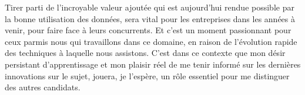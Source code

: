 \documentclass[11pt, a4paper]{awesome-cv}
\begin{document}
\begin{cvletter}
\begin{comment}
Since leaving the world of academic research I have been able to adapt my skills to the fields of Data Engineering and Data Analysis. 
I have also extensive experience with Python, which I have used in several contexts, for example as a tool for analyzing data with 
\texttt{pandas}/\texttt{scikit-learn}, as a tool for moving/extracting data with \texttt{sqlalchemy} and as a means to visualize data with 
\texttt{matplotlib/seaborn/Plotly}, among others. Through practice, I have gained significant knowledge of SQL and tools like Dataiku DSS, 
for which I am an instructor.
Among my most notable professional experiences I count the time that I spend at Essilor. My job consisted of \underline{creating ETLs} written in python which 
handled data from the company's fabrication machines and optical calculators. These data were then made available through the Amazon cloud and analyzed 
using Dataiku DSS. My current project at L'Oréal has brought me \underline{to work on the construction of a data infrastructure} to handle the needs of the R\&D teams, 
thus it has been paramount to construct datawarehouses and datamarts to give users access to up to data information on things like worldwide products, ingredients, 
regulations, etc.  My added value in these projects appart from my daily activities has been twofold: by applying my data analysis skills I have been able to 
provide decision makers with valuable information with regard to the tasks that need to be prioritized while my capacity to abstract concepts has allowed me to 
automate time-consuming tasks.

I am a highly motivated person who is able to adapt to different environments, whether they be technical or cultural, having lived in Colombia, Ireland and France. The projects that I have worked on outside fundamental research have touched upon a theme that is common for many companies nowdays, namely the migration of their existing on-premise infrastructures towards the cloud. 
Leveraging the incredible value that is present within data will be vital for businesses in the coming years as it will allow them gain a competitive edge over their competitors. These are indeed exciting times for those of us who are working in this field due to the fast-paced evolution that we are witnessing. It is within this context that my eagerness to learn and stay up to date with the latest developments plays a critical role in distinguishing myself from other candidates. 
\end{comment}

Tirer parti de l'incroyable valeur ajoutée qui est aujourd'hui rendue possible par la bonne utilisation des données, sera vital pour les entreprises dans les années à venir, pour faire face à leurs concurrents. 
Et c'est un moment passionnant pour ceux parmis nous qui travaillons dans ce domaine, en raison de l'évolution rapide des techniques à laquelle nous assistons. 
C'est dans ce contexte que mon désir persistant d'apprentissage et mon plaisir réel de me tenir informé sur les dernières innovations sur le sujet, jouera, je l'espère, un rôle essentiel pour me distinguer des autres candidats.
\
\end{cvletter}

\makeletterclosing
\end{document}
